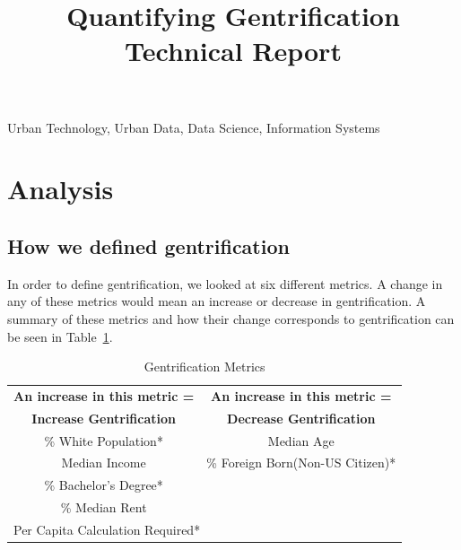 \documentclass[conference]{IEEEtran}
\begin{document}
\title{Quantifying Gentrification Technical Report}

\author{
\and
{}
\and
{}
}

\maketitle

\begin{IEEEkeywords}
Urban Technology, Urban Data, Data Science, Information Systems
\end{IEEEkeywords}


\section{Analysis}

\subsection{How we defined gentrification}
In order to define gentrification, we looked at six different metrics. A change in any of these metrics would mean an increase or decrease in gentrification. A summary of these metrics and how their change corresponds to gentrification can be seen in Table~\ref{gen_metrics}.

\begin{table}[htbp]
\caption{Gentrification Metrics}
\begin{center}
\begin{tabular}{cc}
\hline\hline
\textbf{An increase in this metric =} & \textbf{An increase in this metric =} \\
\textbf{Increase Gentrification} & \textbf{Decrease Gentrification} \\
\hline
\% White Population* & Median Age                                   \\
Median Income        & \% Foreign Born(Non-US Citizen)*              \\
\% Bachelor's Degree* & \\
\% Median Rent &\\
\hline\hline
\multicolumn{2}{l}{Per Capita Calculation Required*}
\end{tabular}
\label{gen_metrics}
\end{center}
\end{table}
\end{document}

